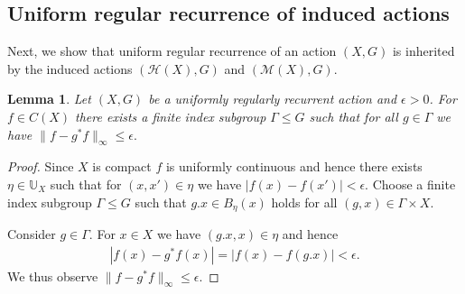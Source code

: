 \documentclass[12pt, reqno]{amsart}
\newtheorem{lemma}[theorem]{Lemma}
\theoremstyle{definition}
\theoremstyle{remark}
\numberwithin{equation}{section}
\theoremstyle{theorem}
\theoremstyle{remark}
\def\hyper{{\mathcal{H}}}
\begin{document}
\subsection{Uniform regular recurrence of induced actions}
\label{subsec:RegularRecurrence_UniformRegularRecurrenceOfInducedActions}
Next, we show that uniform regular recurrence of an action $(X,G)$ is inherited by the induced actions $(\hyper(X),G)$ and $(\mathcal{M}(X),G)$.

\begin{lemma}
\label{lem:regularRecurrenceInCX}
    Let $(X,G)$ be a uniformly regularly recurrent action and $\epsilon>0$.
    For $f\in C(X)$ there exists a finite index subgroup $\Gamma\leq G$ such that for all $g\in \Gamma$ we have 
    $\|f-g^*f\|_\infty\leq \epsilon.$
\end{lemma}
\begin{proof}
    Since $X$ is compact $f$ is uniformly continuous and hence there exists $\eta\in \mathbb{U}_X$ such that for $(x,x')\in \eta$ we have 
    $|f(x)-f(x')|<\epsilon$. 
    Choose a finite index subgroup $\Gamma\leq G$ such that $g.x\in B_\eta(x)$ holds for all $(g,x)\in \Gamma\times X$. 
    
    Consider $g\in \Gamma$. 
    For $x\in X$ we have $(g.x,x)\in \eta$ and hence 
    \begin{align*}
        |f(x)-g^*f(x)|
        =|f(x)-f(g.x)|
        <\epsilon. 
    \end{align*} 
    We thus observe $\|f-g^*f\|_\infty \leq \epsilon$. 
\end{proof}
\end{document}
